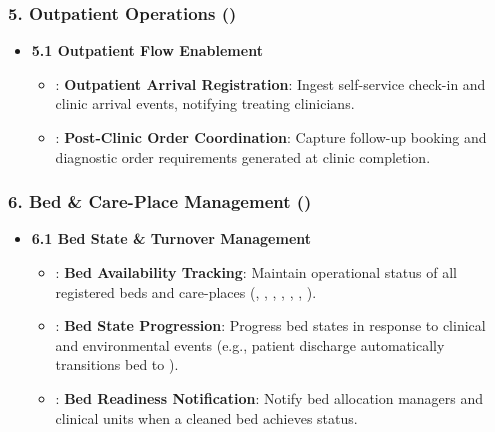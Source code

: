 \subsubsection*{5. Outpatient Operations (\texttt{})}
\label{rad:enabling:502}

\begin{itemize}

\item
\textbf{5.1 Outpatient Flow Enablement}


\begin{itemize}

\item
\texttt{}: \textbf{Outpatient Arrival Registration}: Ingest self-service check-in and clinic arrival events, notifying treating clinicians.



\item
\texttt{}: \textbf{Post-Clinic Order Coordination}: Capture follow-up booking and diagnostic order requirements generated at clinic completion.



\end{itemize}


\end{itemize}
\label{rad:enabling:506}
\subsubsection*{6. Bed \& Care-Place Management (\texttt{})}
\label{rad:enabling:507}

\begin{itemize}

\item
\textbf{6.1 Bed State \& Turnover Management}


\begin{itemize}

\item
\texttt{}: \textbf{Bed Availability Tracking}: Maintain operational status of all registered beds and care-places (\texttt{}, \texttt{}, \texttt{}, \texttt{}, \texttt{}, \texttt{}, \texttt{}).



\item
\texttt{}: \textbf{Bed State Progression}: Progress bed states in response to clinical and environmental events (e.g., patient discharge automatically transitions bed to \texttt{}).



\item
\texttt{}: \textbf{Bed Readiness Notification}: Notify bed allocation managers and clinical units when a cleaned bed achieves \texttt{} status.



\end{itemize}


\end{itemize}
\label{rad:enabling:512}
